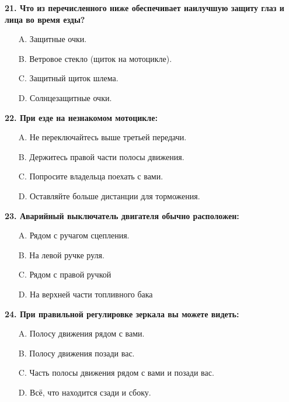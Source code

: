 \begin{minipage}{\linewidth}
\vspace{1em}\noindent\textbf{21. Что из перечисленного ниже обеспечивает наилучшую защиту глаз и лица во время езды?}

\begin{itemize}[nosep,leftmargin=2em]
\item [A.] Защитные очки.
\item [B.] Ветровое стекло (щиток на мотоцикле).
\item [C.] Защитный щиток шлема.
\item [D.] Солнцезащитные очки.

\end{itemize}
\end{minipage}


\begin{minipage}{\linewidth}
\vspace{1em}\noindent\textbf{22. При езде на незнакомом мотоцикле:}

\begin{itemize}[nosep,leftmargin=2em]
\item [A.] Не переключайтесь выше третьей передачи.
\item [B.] Держитесь правой части полосы движения.
\item [C.] Попросите владельца поехать с вами.
\item [D.] Оставляйте больше дистанции для торможения.

\end{itemize}
\end{minipage}


\begin{minipage}{\linewidth}
\vspace{1em}\noindent\textbf{23. Аварийный выключатель двигателя обычно расположен:}

\begin{itemize}[nosep,leftmargin=2em]
\item [A.] Рядом с ручагом сцепления.
\item [B.] На левой ручке руля.
\item [C.] Рядом с правой ручкой
\item [D.] На верхней части топливного бака

\end{itemize}
\end{minipage}


\begin{minipage}{\linewidth}
\vspace{1em}\noindent\textbf{24. При правильной регулировке зеркала вы можете видеть:}

\begin{itemize}[nosep,leftmargin=2em]
\item [A.] Полосу движения рядом с вами.
\item [B.] Полосу движения позади вас.
\item [C.] Часть полосы движения рядом с вами и позади вас.
\item [D.] Всё, что находится сзади и сбоку.

\end{itemize}
\end{minipage}


